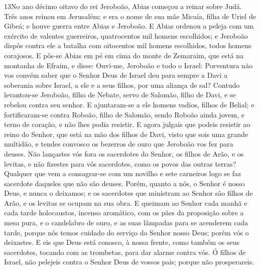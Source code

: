 \lettrine{13} No ano décimo oitavo do rei Jeroboão, Abias
começou a reinar sobre Judá. Três anos reinou em Jerusalém; e
era o nome de sua mãe Micaía, filha de Uriel de Gibeá; e houve
guerra entre Abias e Jeroboão. E Abias ordenou a peleja com um
exército de valentes guerreiros, quatrocentos mil homens escolhidos;
e Jeroboão dispôs contra ele a batalha com oitocentos mil homens
escolhidos, todos homens corajosos. E pôs-se Abias em pé em cima
do monte de Zemaraim, que está na montanha de Efraim, e disse:
Ouvi-me, Jeroboão e todo o Israel: Porventura não vos convém
saber que o Senhor Deus de Israel deu para sempre a Davi a soberania
sobre Israel, a ele e a seus filhos, por uma aliança de sal?
Contudo levantou-se Jeroboão, filho de Nebate, servo de Salomão,
filho de Davi, e se rebelou contra seu senhor. E ajuntaram-se a
ele homens vadios, filhos de Belial; e fortificaram-se contra
Roboão, filho de Salomão, sendo Roboão ainda jovem, e terno de
coração, e não lhes podia resistir. E agora julgais que podeis
resistir ao reino do Senhor, que está na mão dos filhos de Davi,
visto que sois uma grande multidão, e tendes convosco os bezerros de
ouro que Jeroboão vos fez para deuses. Não lançastes vós fora os
sacerdotes do Senhor, os filhos de Arão, e os levitas, e não
fizestes para vós sacerdotes, como os povos das outras terras?
Qualquer que vem a consagrar-se com um novilho e sete carneiros logo
se faz sacerdote daqueles que não são deuses. Porém, quanto a
nós, o Senhor é nosso Deus, e nunca o deixamos; e os sacerdotes que
ministram ao Senhor são filhos de Arão, e os levitas se ocupam na
sua obra. E queimam ao Senhor cada manhã e cada tarde
holocaustos, incenso aromático, com os pães da proposição sobre a
mesa pura, e o candelabro de ouro, e as suas lâmpadas para se
acenderem cada tarde, porque nós temos cuidado do serviço do Senhor
nosso Deus; porém vós o deixastes. E eis que Deus está
conosco, à nossa frente, como também os seus sacerdotes, tocando com
as trombetas, para dar alarme contra vós. Ó filhos de Israel, não
pelejeis contra o Senhor Deus de vossos pais; porque não
prosperareis.

